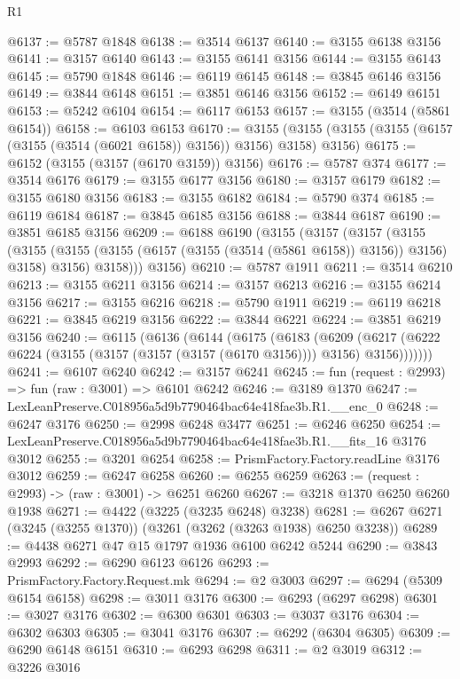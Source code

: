 \begin{lexlean}{R1}
\begin{coremodule}
@6137 := @5787 @1848
@6138 := @3514 @6137
@6140 := @3155 @6138 @3156
@6141 := @3157 @6140
@6143 := @3155 @6141 @3156
@6144 := @3155 @6143
@6145 := @5790 @1848
@6146 := @6119 @6145
@6148 := @3845 @6146 @3156
@6149 := @3844 @6148
@6151 := @3851 @6146 @3156
@6152 := @6149 @6151
@6153 := @5242 @6104
@6154 := @6117 @6153
@6157 := @3155 (@3514 (@5861 @6154))
@6158 := @6103 @6153
@6170 := @3155 (@3155 (@3155 (@3155 (@6157 (@3155 (@3514 (@6021 @6158)) @3156)) @3156) @3158) @3156)
@6175 := @6152 (@3155 (@3157 (@6170 @3159)) @3156)
@6176 := @5787 @374
@6177 := @3514 @6176
@6179 := @3155 @6177 @3156
@6180 := @3157 @6179
@6182 := @3155 @6180 @3156
@6183 := @3155 @6182
@6184 := @5790 @374
@6185 := @6119 @6184
@6187 := @3845 @6185 @3156
@6188 := @3844 @6187
@6190 := @3851 @6185 @3156
@6209 := @6188
    @6190
    (@3155
      (@3157
        (@3157
          (@3155
            (@3155 (@3155 (@3155 (@6157 (@3155 (@3514 (@5861 @6158)) @3156)) @3156) @3158) @3156)
            @3158)))
      @3156)
@6210 := @5787 @1911
@6211 := @3514 @6210
@6213 := @3155 @6211 @3156
@6214 := @3157 @6213
@6216 := @3155 @6214 @3156
@6217 := @3155 @6216
@6218 := @5790 @1911
@6219 := @6119 @6218
@6221 := @3845 @6219 @3156
@6222 := @3844 @6221
@6224 := @3851 @6219 @3156
@6240 := @6115
    (@6136
      (@6144
        (@6175
          (@6183
            (@6209
              (@6217 (@6222 @6224 (@3155 (@3157 (@3157 (@3157 (@6170 @3156)))) @3156) @3156)))))))
@6241 := @6107 @6240
@6242 := @3157 @6241
@6245 := fun (request : @2993) => fun (raw : @3001) => @6101 @6242
@6246 := @3189 @1370
@6247 := LexLeanPreserve.C018956a5d9b7790464bac64e418fae3b.R1.__enc_0
@6248 := @6247 @3176
@6250 := @2998 @6248 @3477
@6251 := @6246 @6250
@6254 := LexLeanPreserve.C018956a5d9b7790464bac64e418fae3b.R1.__fits_16 @3176 @3012
@6255 := @3201 @6254
@6258 := PrismFactory.Factory.readLine @3176 @3012
@6259 := @6247 @6258
@6260 := @6255 @6259
@6263 := (request : @2993) -> (raw : @3001) -> @6251 @6260
@6267 := @3218 @1370 @6250 @6260 @1938
@6271 := @4422 (@3225 (@3235 @6248) @3238)
@6281 := @6267 @6271 (@3245 (@3255 @1370)) (@3261 (@3262 (@3263 @1938) @6250 @3238))
@6289 := @4438 @6271 @47 @15 @1797 @1936 @6100 @6242 @5244
@6290 := @3843 @2993
@6292 := @6290 @6123 @6126
@6293 := PrismFactory.Factory.Request.mk
@6294 := @2 @3003
@6297 := @6294 (@5309 @6154 @6158)
@6298 := @3011 @3176
@6300 := @6293 (@6297 @6298)
@6301 := @3027 @3176
@6302 := @6300 @6301
@6303 := @3037 @3176
@6304 := @6302 @6303
@6305 := @3041 @3176
@6307 := @6292 (@6304 @6305)
@6309 := @6290 @6148 @6151
@6310 := @6293 @6298
@6311 := @2 @3019
@6312 := @3226 @3016

\end{coremodule}
\end{lexlean}

